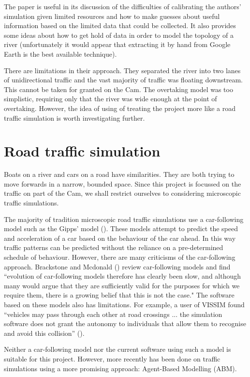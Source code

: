   The paper is useful in its discussion of the difficulties of calibrating
  the authors' simulation given limited resources and how to make guesses
  about useful information based on the limited data that could be
  collected. It also provides some ideas about how to get hold of data
  in order to model the topology of a river (unfortunately it would
  appear that extracting it by hand from Google Earth is the best available
  technique). 
  
  There are limitations in their approach. They 
  separated the river into two lanes of unidirectional traffic and the
  vast majority of traffic was floating downstream. This cannot be taken for granted on the Cam. The overtaking model was too simplistic, requiring only that the river was wide enough at the point of overtaking.
  However, the idea of using of treating the project more like a road traffic simulation is worth investigating further.
  
  \section{Road traffic simulation}
    Boats on a river and cars on a road have similarities. They are both trying to move forwards in a narrow, bounded space. Since this project is focussed on the traffic on part of the Cam, we shall restrict ourselves to considering microscopic traffic simulations.
    
    The majority of tradition microscopic road traffic simulations use a car-following model such as the Gipps' model (\cite{Gipps1981}). These models attempt to predict the speed and acceleration of a car based on the behaviour of the car ahead. In this way traffic patterns can be predicted without the reliance on a pre-determined schedule of behaviour. However, there are many criticisms of the car-following approach. Brackstone and Mcdonald (\cite{Brackstone2000}) review car-following models and find ``evolution of car-following models therefore has clearly been slow, and although many would argue that they are sufficiently valid for the purposes for which we require them, there is a growing belief that this is not the case." The software based on these models also has limitations. For example, a user of VISSIM found ``vehicles may pass through each other at road crossings ... the simulation software does not grant the autonomy to individuals that allow them to recognise and avoid this collision'' (\cite{Manley}). 
    
    Neither a car-following model nor the current software using such a model is suitable for this project. However, more recently has been done on traffic simulations using a more promising approach: Agent-Based Modelling (ABM).
      
